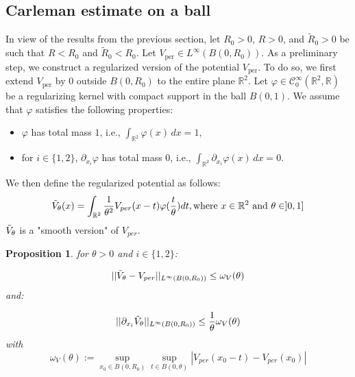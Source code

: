 \documentclass[leqno,11pt,letterpaper, english]{amsart}
\theoremstyle{plain}
\newtheorem{prop}{Proposition}[section]
\theoremstyle{definition}
\numberwithin{equation}{section}
\begin{document}
\subsection{Carleman estimate on a ball}
\label{section:CarlemansurBouleetPotentielBornee}
In view of the results from the previous section, let \( R_0 > 0 \), \( R > 0 \), and \( \tilde{R}_0 > 0 \) be such that \( R < R_0 \) and \( \tilde{R}_0 < R_0 \).
Let \( V_{\text{per}} \in L^\infty(B(0, R_0)) \). As a preliminary step, we construct a regularized version of the potential \( V_{\text{per}} \). To do so, we first extend \( V_{\text{per}} \) by \( 0 \) outside \( B(0, R_0) \) to the entire plane \( \mathbb{R}^2 \).
Let \( \varphi \in \mathcal{C}_0^\infty(\mathbb{R}^2, \mathbb{R}) \) be a regularizing kernel with compact support in the ball \( B(0, 1) \). 
We assume that \( \varphi \) satisfies the following properties:
\begin{itemize}
    \item \( \varphi \) has total mass \( 1 \), i.e., \( \int_{\mathbb{R}^2} \varphi(x) \, dx = 1 \),
    \item for \( i \in \{1, 2\} \), \( \partial_{x_i} \varphi \) has total mass \( 0 \), i.e., \( \int_{\mathbb{R}^2} \partial_{x_i} \varphi(x) \, dx = 0 \). 
\end{itemize}
We then define the regularized potential as follows:
\begin{equation}
\label{eq: definition-reg-de-V}
    \Tilde{V}_\theta(x)=\int_{\mathbb{R}^2} \frac{1}{\theta^2} V_{per}(x-t)\varphi(\frac{t}{\theta})dt, \mbox{where } x\in\mathbb{R}^2 \mbox{ and } \theta \in ]0,1]
\end{equation}
$\Tilde{V}_\theta$ is a "smooth version" of $V_{per}$.

\begin{prop}
	\label{prop: def de omega_V}
for $\theta>0$ and $i\in\{1,2\}$:

\begin{equation}
||\Tilde{V}_\theta-V_{per}||_{L^\infty(B(0,R_0))}\leq \omega_V(\theta)
\end{equation}
and:

\begin{equation}
\label{eq: divergence de tilde V theta}
||\partial_{x_i} \Tilde{V}_\theta||_{L^\infty(B(0,R_0))}\leq \frac{1}{\theta}\omega_V(\theta)
\end{equation}
with
\begin{equation}
\omega_V(\theta):=\sup_{x_0\in B(0,R_0)} \sup_{t \in B(0,\theta)}|V_{per}(x_0-t)-V_{per}(x_0)|
\end{equation}
\end{prop}
\end{document}
